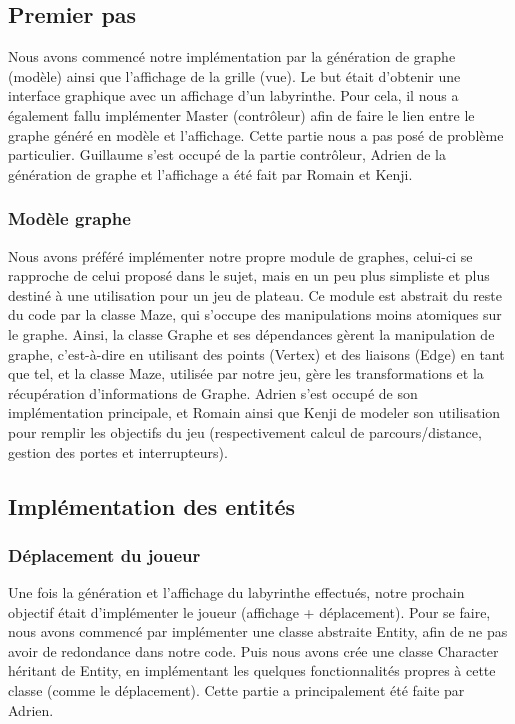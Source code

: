 \documentclass[a4paper]{article}
\begin{document}
\subsection{Premier pas}
Nous avons commencé notre implémentation par la génération de graphe (modèle)
ainsi que l'affichage de la grille (vue). Le but était d'obtenir une interface
graphique avec un affichage d'un labyrinthe. Pour cela, il nous a également
fallu implémenter Master (contrôleur) afin de faire le lien entre le graphe
généré en modèle et l'affichage. Cette partie nous a pas posé de
problème particulier. Guillaume s'est occupé de la partie contrôleur, Adrien
de la génération de graphe et l'affichage a été fait par Romain et Kenji.

\subsubsection{Modèle graphe}

Nous avons préféré implémenter notre propre module de graphes, celui-ci se rapproche de celui proposé dans le sujet, mais en un peu plus simpliste et plus destiné à une utilisation pour un jeu de plateau. Ce module est abstrait du reste du code par la classe Maze, qui s'occupe des manipulations moins atomiques sur le graphe. Ainsi, la classe Graphe et ses dépendances gèrent la manipulation de graphe, c'est-à-dire en utilisant des points (Vertex) et des liaisons (Edge) en tant que tel, et la classe Maze, utilisée par notre jeu, gère les transformations et la récupération d'informations de Graphe. Adrien s'est occupé de son implémentation principale, et Romain ainsi que Kenji de modeler son utilisation pour remplir les objectifs du jeu (respectivement calcul de parcours/distance, gestion des portes et interrupteurs).

\subsection{Implémentation des entités}

\subsubsection{Déplacement du joueur}
Une fois la génération et l'affichage du labyrinthe effectués, notre prochain
objectif était d'implémenter le joueur (affichage + déplacement).
Pour se faire, nous avons commencé par implémenter une classe abstraite Entity,
afin de ne pas avoir de redondance dans notre code.
Puis nous avons crée une classe Character héritant de Entity, en implémentant
les quelques fonctionnalités propres à cette classe (comme le déplacement).
Cette partie a principalement été faite par Adrien.
\end{document}
